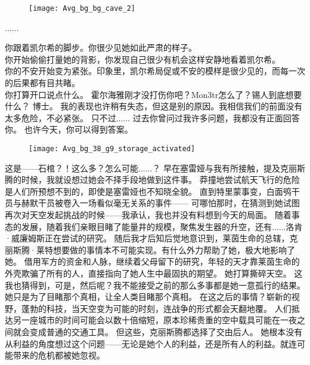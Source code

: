 \documentclass[openany]{book}
\begin{document}
\begin{figure}[h]
    \centering
    \texttt{[image: Avg\_bg\_bg\_cave\_2]}
\end{figure}
\begin{dialogue}
     ......\par
    你跟着凯尔希的脚步。你很少见她如此严肃的样子。\\
    你开始偷偷打量她的背影，你发现自己很少有机会这样安静地看着凯尔希。\\
    你的不安开始变为紧张。印象里，凯尔希局促或不安的模样是很少见的，而每一次的后果都有目共睹。\\
    你打算开口说点什么。
     霍尔海雅刚才没打伤你吧？Mon3tr怎么了？锡人到底想要什么？
     博士。
     我的表现也许稍有失态，但这是别的原因。我相信我们的前面没有太多危险，不必紧张。
     只不过......
     过去你曾问过我许多问题，我都没有正面回答你。
     也许今天，你可以得到答案。
    \begin{figure}[h]
        \centering
        \texttt{[image: Avg\_bg\_38\_g9\_storage\_activated]}
    \end{figure}
     这是——石棺？！这么多？怎么可能......？
     早在塞雷娅与我有所接触，提及克丽斯腾的时候，我就设想过她会不择手段地做到这件事。
     莽撞地尝试航天飞行的危险是人们所预想不到的，即使是塞雷娅也不知晓全貌。
     直到特里蒙事变，白面鸮干员与赫默干员被卷入一场看似毫无关系的事件——
     可哪怕那时，在猜测到她试图再次对天空发起挑战的时候——我承认，我也并没有料想到今天的局面。
     随着事态的发展，随着我们亲眼目睹了能量井的规模，聚焦发生器的升空，还有......洛肯·威廉姆斯正在尝试的研究。
     随后我才后知后觉地意识到，莱茵生命的总辖，克丽斯腾·莱特想要做的事情本不可能实现。有什么外力帮助了她，极大地影响了她。
     借用军方的资金和人脉，继续着父母留下的研究，年轻的天才靠莱茵生命的外壳欺骗了所有的人，直接指向了她人生中最固执的期望。
     她打算撕碎天空。
     这我也猜得到，可是，然后呢？我不能接受之前的那么多事都是她一意孤行的结果。
     她只是为了目睹那个真相，让全人类目睹那个真相。
     在这之后的事情？崭新的视野，蓬勃的科技，当天空变为可能的时刻，连战争的形式都会天翻地覆。
     人们抵达另一座城市的时间可能会以数十倍缩短，原本珍稀贵重的空中载具可能在一夜之间就会变成普通的交通工具。
     但这些，克丽斯腾都选择了交由后人。
     她根本没有从利益的角度想过这个问题——无论是她个人的利益，还是所有人的利益。就连可能带来的危机都被她忽视。

\end{dialogue}
\end{document}
